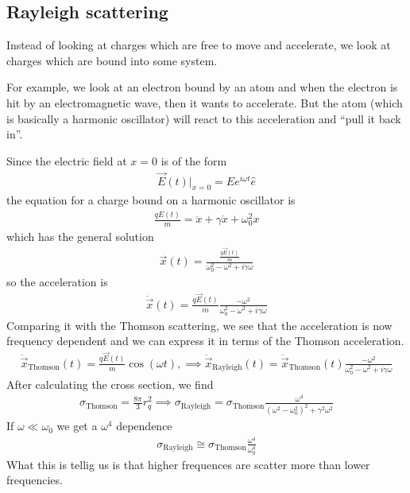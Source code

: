 \subsection{Rayleigh scattering}
Instead of looking at charges which are free to move and accelerate, we look at charges which are bound into some system.

For example, we look at an electron bound by an atom and when the electron is hit by an electromagnetic wave, then it wants to accelerate. 
But the atom (which is basically a harmonic oscillator) will react to this acceleration and ``pull it back in''.

Since the electric field at $x=0$ is of the form
\begin{align*}
  \vec{E}(t)|_{x = 0} = E e^{i \omega t} \hat{e}
\end{align*}
the equation for a charge bound on a harmonic oscillator is
\begin{align*}
  \frac{q E(t)}{m} = \ddot{x} + \gamma \dot{x} + \omega_0^{2} x
\end{align*}
which has the general solution
\begin{align*}
  \vec{x}(t)  = \frac{\frac{q \vec{E}(t)}{m}}{\omega_0^{2} - \omega^{2} + i \gamma \omega}
\end{align*}
so the acceleration is
\begin{align*}
  \ddot{\vec{x}}(t) = \frac{q \vec{E}(t)}{m} \frac{- \omega^{2}}{\omega_0^{2} - \omega^{2} + i \gamma \omega}
\end{align*}
Comparing it with the Thomson scattering, 
we see that the acceleration is now frequency dependent and we can express it in terms of the Thomson acceleration.
\begin{align*}
  \ddot{\vec{x}}_{\text{Thomson}}(t) = \frac{q \vec{E}(t)}{m}\cos(\omega t), \implies \ddot{\vec{x}}_{\text{Rayleigh}}(t) = \ddot{\vec{x}}_{\text{Thomson}}(t) \frac{- \omega^{2}}{\omega_0^{2} - \omega^{2} + i \gamma \omega}
\end{align*}
After calculating the cross section, we find
\begin{align*}
  \sigma_{\text{Thomson}} = \frac{8 \pi}{3} r_q^{2} \implies
  \sigma_{\text{Rayleigh}} = \sigma_{\text{Thomson}} \frac{\omega^{4}}{(\omega^{2}- \omega_0^{2})^{2} + \gamma^{2} \omega^{2}}
\end{align*}
If $\omega \ll \omega_0$ we get a $\omega^{4}$ dependence
\begin{align*}
  \sigma_{\text{Rayleigh}} \cong \sigma_{\text{Thomson}} \frac{\omega^{4}}{\omega_0^{4}}
\end{align*}
What this is tellig us is that higher frequences are scatter more than lower frequencies.

